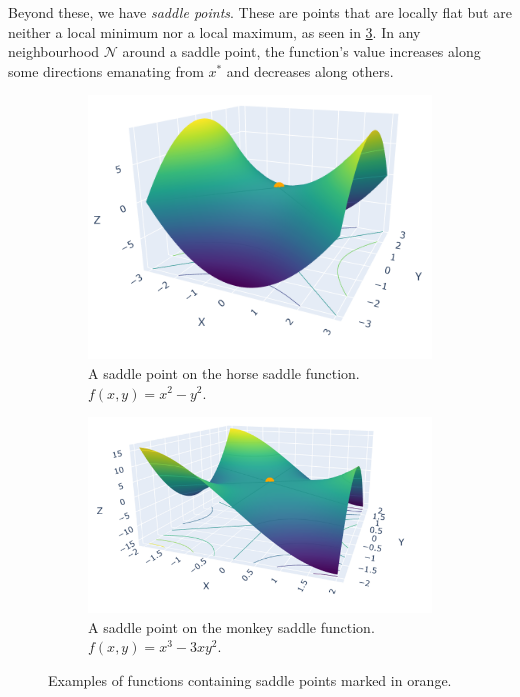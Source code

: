 Beyond these, we have \textit{saddle points}. These are points that are locally flat but are neither a local minimum nor a local maximum, as seen in \cref{fig:saddle_point}. In any neighbourhood $\mathcal{N}$ around a saddle point, the function's value increases along some directions emanating from $x^*$ and decreases along others.

\begin{figure}[h]
    \begin{subfigure}[b]{0.48\linewidth}
        \centering
        \includegraphics[width=0.8\linewidth]{figures/2background/horse_saddle.png}
        \caption{A saddle point on the horse saddle function. \\
        $f(x,y) = x^2 - y^2$.}
        \label{fig:horse_saddle}
    \end{subfigure}
    \hfill
    \begin{subfigure}[b]{0.48\linewidth}
        \centering
        \includegraphics[width=\linewidth]{figures/2background/monkey_saddle.png}
        \caption{A saddle point on the monkey saddle function. \\
        $f(x,y) = x^3 - 3xy^2$.}
        \label{fig:monkey_saddle}
    \end{subfigure}
    \caption{Examples of functions containing saddle points marked in orange.}
    \label{fig:saddle_point}
\end{figure}

